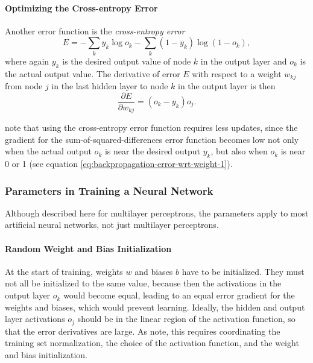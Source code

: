 \paragraph{Optimizing the Cross-entropy Error\label{par:Optimizing-the-Cross-entropy-error}}

Another error function is the \emph{cross-entropy error}
\cite{NasrJoun2002} 
\[
E=-\sum_{k}y_{k}\log o_{k}-\sum_{k}(1-y_{k})\log(1-o_{k}),
\]
 where again $y_{k}$ is the desired output value of node $k$ in
the output layer and $o_{k}$ is the actual output value. The derivative
of error $E$ with respect to a weight $w_{kj}$ from node $j$ in
the last hidden layer to node $k$ in the output layer is then
\[
\frac{\partial E}{\partial w_{kj}}=(o_{k}-y_{k})o_{j}.
\]

\cite{GolikNey2013} note that using the cross-entropy error function
requires less updates, since the gradient for the sum-of-squared-differences
error function becomes low not only when the actual output $o_{k}$
is near the desired output $y_{k}$, but also when $o_{k}$ is near
0 or 1 (see equation \ref{eq:backpropagation-error-wrt-weight-1}).

\subsubsection{Parameters in Training a Neural Network\label{subsec:Parameters-of-Training-a-Multilayer-Perceptron}}

Although described here for multilayer perceptrons, the parameters
apply to most artificial neural networks, not just multilayer perceptrons.

\paragraph{Random Weight and Bias Initialization}

At the start of training, weights $w$ and biases $b$ have to be
initialized. They must not all be initialized to the same value, because
then the activations in the output layer $o_{k}$ would become equal,
leading to an equal error gradient for the weights and biases, which
would prevent learning. Ideally, the hidden and output layer activations
$o_{j}$ should be in the linear region of the activation function,
so that the error derivatives are large. As \cite{LeCunMuller1998}
note, this requires coordinating the training set  normalization,
the choice of the activation function, and the weight and bias initialization.

